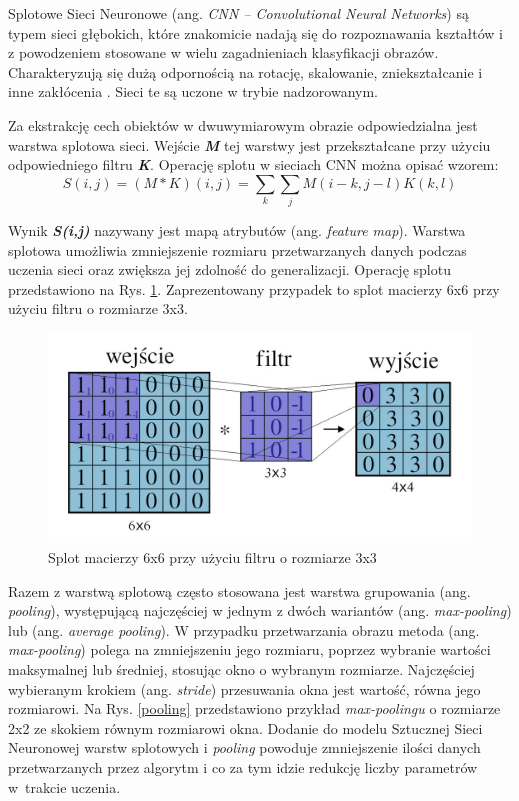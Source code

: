 Splotowe Sieci Neuronowe (ang. \emph{CNN -- Convolutional Neural Networks}) są typem sieci głębokich, które znakomicie nadają się do rozpoznawania kształtów i z powodzeniem stosowane w wielu zagadnieniach klasyfikacji obrazów. Charakteryzują się dużą odpornością na rotację, skalowanie, zniekształcanie i inne zakłócenia \cite{haykin2009neural}. Sieci te są uczone w trybie nadzorowanym. 

Za ekstrakcję cech obiektów w dwuwymiarowym obrazie odpowiedzialna jest warstwa splotowa sieci. Wejście \textbf{\emph{M}} tej warstwy jest przekształcane przy użyciu odpowiedniego filtru \textbf{\emph{K}}. Operację splotu w sieciach CNN można opisać wzorem:
$$
S(i,j) = (M*K)(i,j) =\sum_{k}{\sum_{j}{M(i - k, j - l)K(k, l)}}
$$

Wynik \textbf{\emph{S(i,j)}} nazywany jest mapą atrybutów (ang. \emph{feature map}). Warstwa splotowa umożliwia zmniejszenie rozmiaru przetwarzanych danych podczas uczenia sieci oraz zwiększa jej zdolność do generalizacji. Operację splotu przedstawiono na Rys. \ref{conv}. Zaprezentowany przypadek to splot macierzy 6x6 przy użyciu filtru o rozmiarze 3x3. 


\begin{figure}[!h]
  \centering
  \includegraphics[width=\textwidth]{img/conv.jpg}
  \caption{Splot macierzy 6x6 przy użyciu filtru o rozmiarze 3x3}
  \label{conv}
\end{figure}


Razem z warstwą splotową często stosowana jest warstwa grupowania (ang. \emph{pooling}), występującą najczęściej w jednym z dwóch wariantów (ang. \emph{max-pooling}) lub (ang. \emph{average pooling}). W przypadku przetwarzania obrazu metoda (ang. \emph{max-pooling}) polega na zmniejszeniu jego rozmiaru, poprzez wybranie wartości maksymalnej lub średniej, stosując okno o wybranym rozmiarze. Najczęściej wybieranym krokiem (ang. \emph{stride}) przesuwania okna jest wartość, równa jego rozmiarowi. Na Rys. \ref{pooling} przedstawiono przykład \emph{max-poolingu} o rozmiarze 2x2 ze skokiem równym rozmiarowi okna. Dodanie do modelu Sztucznej Sieci Neuronowej warstw splotowych i \emph{pooling} powoduje zmniejszenie ilości danych przetwarzanych przez algorytm i co za tym idzie redukcję liczby parametrów w~trakcie uczenia. 


